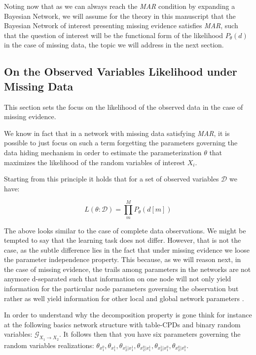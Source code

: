 \documentclass[11pt]{article}
\begin{document}
\begin{article}
Noting now that as we can always reach the \emph{MAR} condition by
expanding a Bayesian Network, we will assume for the theory in this
manuscript that the Bayesian Network of interest presenting missing
evidence satisfies \emph{MAR}, such that the question of interest will
be the functional form of the likelihood \(P_{\theta} (d)\) in the
case of missing data, the topic we will address in the next
section.

\subsection{On the Observed Variables Likelihood under Missing Data}
\label{sec:orga583eb1}

This section sets the focus on the likelihood of the observed data
in the case of missing evidence.

We know in fact that in a network with missing data satisfying
\emph{MAR}, it is possible to just focus on such a term forgetting the
parameters governing the data hiding mechanism in order to estimate
the parameterization \(\theta\) that maximizes the likelihood of the
random variables of interest \(X_i\).

Starting from this principle it holds that for a set of observed
variables \(\mathscr{D}\) we have:

$$ L(\theta: \mathscr{D}) = \prod_m^M P_\theta(d[m]) $$

The above looks similar to the case of complete data
observations. We might be tempted to say that the learning task
does not differ. However, that is not the case, as the subtle
difference lies in the fact that under missing evidence we loose
the parameter independence property. This because, as we will
reason next, in the case of missing evidence, the trails among
parameters in the networks are not anymore d-separated such that
information on one node will not only yield information for the
particular node parameters governing the observation but rather as
well yield information for other local and global network
parameters .

In order to understand why the decomposition property is gone think
for instance at the following basics network structure with
table-CPDs and binary random variables: \(\mathscr{G}_{X_1
   \rightarrow X_2}\). It follows then that you have six parameters
governing the random variables realizations: \(\theta_{x_1^0},
   \theta_{x_1^1}, \theta_{x_2^1| x_1^1}, \theta_{x_2^0 | x_1^1},
   \theta_{x_2^1 | x_1^0}, \theta_{x_2^0 | x_1^0}\).


\end{article}
\end{document}
